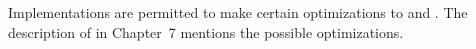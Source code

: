 Implementations are permitted to make certain optimizations to 
 and .  
The description of  in Chapter~7 mentions the
possible optimizations.


\endsubsection%

